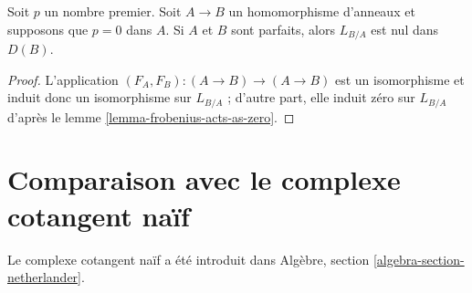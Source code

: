 \begin{lemma}
\label{lemma-perfect-zero}
Soit $p$ un nombre premier. Soit $A \to B$ un homomorphisme d'anneaux et
supposons que $p = 0$ dans $A$. Si $A$ et $B$ sont parfaits, alors $L_{B/A}$
est nul dans $D(B)$.
\end{lemma}

\begin{proof}
L'application $(F_A, F_B) : (A \to B) \to (A \to B)$ est un isomorphisme et
induit donc un isomorphisme sur $L_{B/A}$ ; d'autre part, elle induit zéro sur
$L_{B/A}$ d'après le lemme \ref{lemma-frobenius-acts-as-zero}.
\end{proof}





\section{Comparaison avec le complexe cotangent naïf}
\label{section-surjections}

\noindent
Le complexe cotangent naïf a été introduit dans Algèbre, section
\ref{algebra-section-netherlander}.

